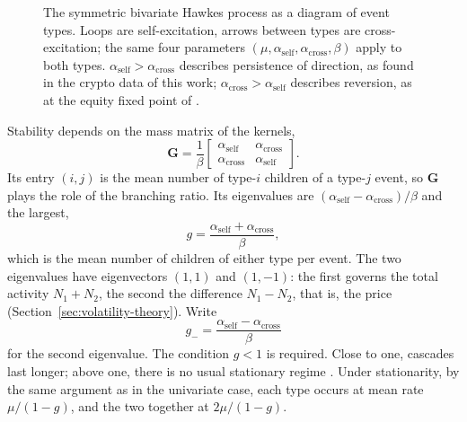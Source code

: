 \begin{figure}[htbp]
\centering
{}
\caption{The symmetric bivariate Hawkes process as a diagram of event types. Loops are
self-excitation, arrows between types are cross-excitation; the same four parameters
\((\mu,\alpha_{\mathrm{self}},\alpha_{\mathrm{cross}},\beta)\) apply to both types.
\(\alpha_{\mathrm{self}}>\alpha_{\mathrm{cross}}\) describes persistence of direction, as
found in the crypto data of this work; \(\alpha_{\mathrm{cross}}>\alpha_{\mathrm{self}}\)
describes reversion, as at the equity fixed point of \citet{lee2023}.}
\label{fig:bivariate}
\end{figure}

Stability depends on the mass matrix of the kernels,
\[
 \mathbf G=\frac{1}{\beta}
 \begin{bmatrix}
  \alpha_{\mathrm{self}} & \alpha_{\mathrm{cross}}\\
  \alpha_{\mathrm{cross}} & \alpha_{\mathrm{self}}
 \end{bmatrix}.
\]
Its entry \((i,j)\) is the mean number of type-\(i\) children of a type-\(j\) event, so
\(\mathbf G\) plays the role of the branching ratio. Its eigenvalues are
\((\alpha_{\mathrm{self}}-\alpha_{\mathrm{cross}})/\beta\) and the largest,
\[
 g=\frac{\alpha_{\mathrm{self}}+\alpha_{\mathrm{cross}}}{\beta},
\]
which is the mean number of children of either type per event. The two eigenvalues have
eigenvectors \((1,1)\) and \((1,-1)\): the first governs the total activity
\(N_1+N_2\), the second the difference \(N_1-N_2\), that is, the price
(Section~\ref{sec:volatility-theory}). Write
\[
 g_-=\frac{\alpha_{\mathrm{self}}-\alpha_{\mathrm{cross}}}{\beta}
\]
for the second eigenvalue. The condition \(g<1\) is
required. Close to one, cascades last longer; above one, there is no usual stationary
regime \citep{hardiman2013,filimonov2012}. Under stationarity, by the same argument as in
the univariate case, each type occurs at mean rate \(\mu/(1-g)\), and the two together at
\(2\mu/(1-g)\).

